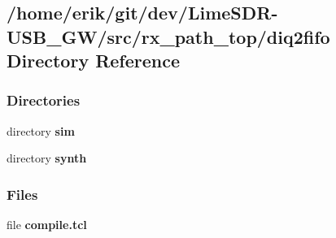 \subsection{/home/erik/git/dev/\+Lime\+S\+D\+R-\/\+U\+S\+B\+\_\+\+G\+W/src/rx\+\_\+path\+\_\+top/diq2fifo Directory Reference}
\label{dir_df3d2f3dbf4b6e78f6f0d88022be6ce5}
\subsubsection*{Directories}
\begin{DoxyCompactItemize}
\item 
directory {\bf sim}
\item 
directory {\bf synth}
\end{DoxyCompactItemize}
\subsubsection*{Files}
\begin{DoxyCompactItemize}
\item 
file {\bf compile.\+tcl}
\end{DoxyCompactItemize}
